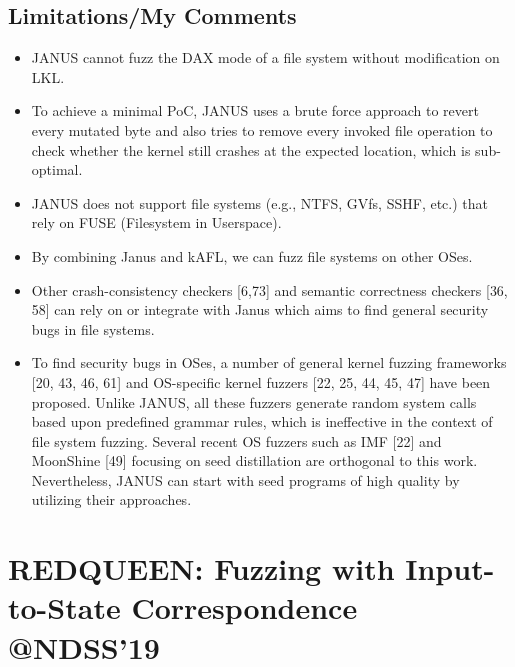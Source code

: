 \documentclass[]{article} %
\begin{document}
\subsection{Limitations/My Comments}
\begin{itemize}
    \item JANUS cannot fuzz the DAX mode of a file system without modification on LKL. 
    \item To achieve a minimal PoC, JANUS uses a brute force approach to revert
every mutated byte and also tries to remove every invoked
file operation to check whether the kernel still crashes at the
expected location, which is sub-optimal.
    \item JANUS does not support file systems (e.g., NTFS, GVfs, SSHF, etc.)
that rely on FUSE (Filesystem in Userspace).
    \item By combining Janus and kAFL, we can fuzz file systems on other OSes.
    \item Other crash-consistency checkers [6,73] and semantic correctness checkers [36, 58] can rely on or integrate with Janus which aims to find general security bugs in file systems.
    \item To find security bugs in OSes, a number
    of general kernel fuzzing frameworks [20, 43, 46, 61] and
    OS-specific kernel fuzzers [22, 25, 44, 45, 47] have been
    proposed. Unlike JANUS, all these fuzzers generate random
    system calls based upon predefined grammar rules, which is
    ineffective in the context of file system fuzzing. Several recent
    OS fuzzers such as IMF [22] and MoonShine [49] focusing
    on seed distillation are orthogonal to this work. Nevertheless,
    JANUS can start with seed programs of high quality by utilizing
    their approaches.
\end{itemize}
\newpage
\section{REDQUEEN: Fuzzing with Input-to-State Correspondence @NDSS'19}
\end{document}
